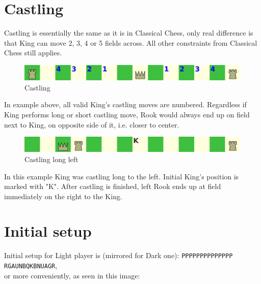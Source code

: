 \documentclass[a5paper,12pt,draft]{book} %
\begin{document}
\clearpage

\section*{Castling}

Castling is essentially the same as it is in Classical Chess, only real difference is that
King can move 2, 3, 4 or 5 fields across. All other constraints from Classical Chess still
applies.

\noindent
\begin{figure}[!h]
\includegraphics[width=1.0\textwidth, keepaspectratio=true]{../gfx/castlings/08_age_of_aquarius_castling.png}
\caption{Castling}
\label{fig:aoa_castling}
\end{figure}

In example above, all valid King's castling moves are numbered. Regardless if King performs
long or short castling move, Rook would always end up on field next to King, on opposite side
of it, i.e. closer to center.

\noindent
\begin{figure}[!h]
\includegraphics[width=1.0\textwidth, keepaspectratio=true]{../gfx/castlings/long_left/08_age_of_aquarius_castling_long_left.png}
\caption{Castling long left}
\label{fig:aoa_castling_long_left}
\end{figure}

In this example King was castling long to the left. Initial King's position is marked with "K".
After castling is finished, left Rook ends up at field immediately on the right to the King.

\clearpage

\section*{Initial setup}

Initial setup for Light player is (mirrored for Dark one):
\texttt{PPPPPPPPPPPPPP \\
        RGAUNBQKBNUAGR}, \\
or more conveniently, as seen in this image:
\end{document}
